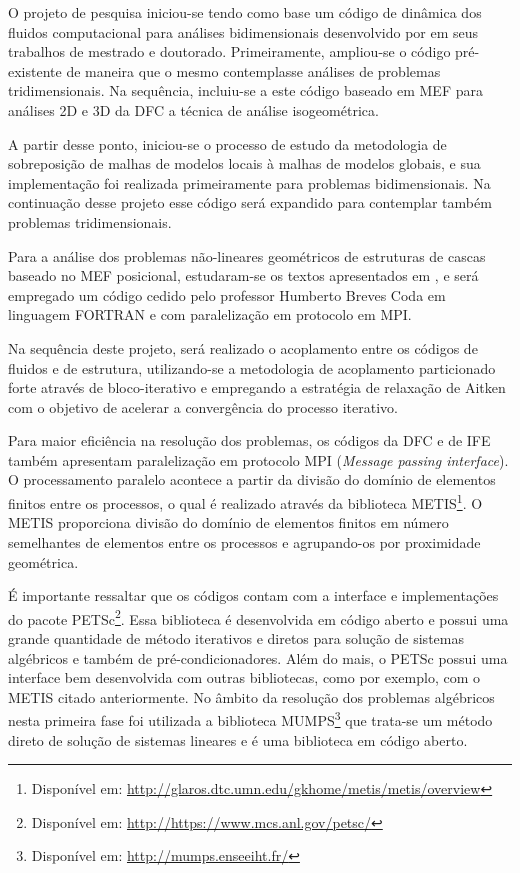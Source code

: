 \documentclass[tese_patricia.tex]{subfiles}
\begin{document}
O projeto de pesquisa iniciou-se tendo como base um código de dinâmica dos fluidos computacional para análises bidimensionais desenvolvido por  em seus trabalhos de mestrado e doutorado. Primeiramente, ampliou-se o código pré-existente de maneira que o mesmo contemplasse análises de problemas tridimensionais. Na sequência, incluiu-se a este código baseado em MEF para análises 2D e 3D da DFC a técnica de análise isogeométrica.

A partir desse ponto, iniciou-se o processo de estudo da metodologia de sobreposição de malhas de modelos locais à malhas de modelos globais, e sua implementação foi realizada primeiramente para problemas bidimensionais. Na continuação desse projeto esse código será expandido para contemplar também problemas tridimensionais.

Para a análise dos problemas não-lineares geométricos de estruturas de cascas baseado no MEF posicional, estudaram-se os textos apresentados em , e será empregado um código cedido pelo professor Humberto Breves Coda em linguagem FORTRAN e com paralelização em protocolo em MPI.

Na sequência deste projeto, será realizado o acoplamento entre os códigos de fluidos e de estrutura, utilizando-se a metodologia de acoplamento particionado forte através de bloco-iterativo e empregando a estratégia de relaxação de Aitken com o objetivo de acelerar a convergência do processo iterativo.

Para maior eficiência na resolução dos problemas, os códigos da DFC e de IFE também apresentam paralelização em protocolo MPI (\textit{Message passing interface}). O processamento paralelo acontece a partir da divisão do domínio de elementos finitos entre os processos, o qual é realizado através da biblioteca METIS\footnote{Disponível em: \url{http://glaros.dtc.umn.edu/gkhome/metis/metis/overview}}. O METIS proporciona divisão do domínio de elementos finitos em número semelhantes de elementos entre os processos e agrupando-os por proximidade geométrica.

É importante ressaltar que os códigos contam com a interface e implementações do pacote PETSc\footnote{Disponível em: \url{http://https://www.mcs.anl.gov/petsc/}}. Essa biblioteca é desenvolvida em código aberto e possui uma grande quantidade de método iterativos e diretos para solução de sistemas algébricos e também de pré-condicionadores. Além do mais, o PETSc possui uma interface bem desenvolvida com outras bibliotecas, como por exemplo, com o METIS citado anteriormente. No âmbito da resolução dos problemas algébricos nesta primeira fase foi utilizada a biblioteca MUMPS\footnote{Disponível em: \url{ http://mumps.enseeiht.fr/}} que trata-se um método direto de solução de sistemas lineares e é uma biblioteca em código aberto.
\end{document}
